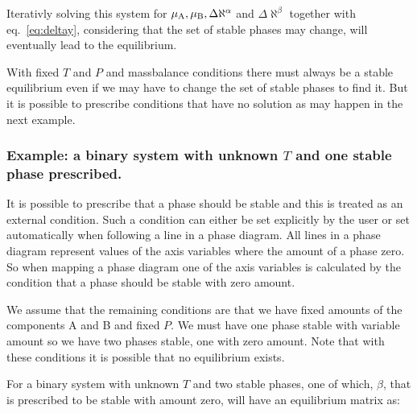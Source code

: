 \documentclass[12pt]{article}
\begin{document}
Iterativly solving this system for $\mu_{\rm A}, \mu_{\rm B},
\Delta\aleph^{\alpha}$ and $\Delta\aleph^{\beta}$ together with
eq.~\ref{eq:deltay}, considering that the set of stable phases may
change, will eventually lead to the equilibrium.

With fixed $T$ and $P$ and massbalance conditions there must always be
a stable equilibrium even if we may have to change the set of stable
phases to find it.  But it is possible to prescribe conditions that
have no solution as may happen in the next example.

\subsubsection{Example: a binary system with unknown $T$ and one
stable phase prescribed.}

It is possible to prescribe that a phase should be stable and this is
treated as an external condition.  Such a condition can either be set
explicitly by the user or set automatically when following a line in a
phase diagram.  All lines in a phase diagram represent values of the
axis variables where the amount of a phase zero.  So when mapping a
phase diagram one of the axis variables is calculated by the condition
that a phase should be stable with zero amount.

We assume that the remaining conditions are that we have fixed amounts
of the components A and B and fixed $P$.  We must have one phase
stable with variable amount so we have two phases stable, one with
zero amount.  Note that with these conditions it is possible that no
equilibrium exists.

For a binary system with unknown $T$ and two stable phases, one of
which, $\beta$, that is prescribed to be stable with amount zero, will
have an equilibrium matrix as:

\label{eq:systemmatrix3}
\end{document}
